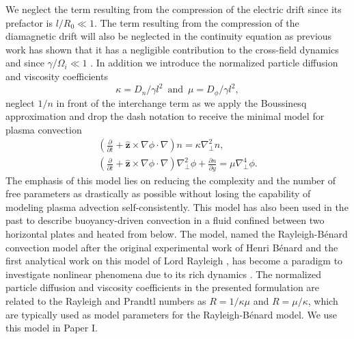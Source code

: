 We neglect the term resulting from the compression of the electric drift since its prefactor is $l/R_0 \ll 1$. The term resulting from the compression of the diamagnetic drift will also be neglected in the continuity equation as previous work has shown that it has a negligible contribution to the cross-field dynamics and since $\gamma/\Omega_i \ll 1$ \cite{Garcia_thesis}. In addition we introduce the normalized particle diffusion and viscosity coefficients
\begin{equation}
	\kappa = D_n/\gamma l^2 \,\,\,\text{and}\,\,\, \mu = D_\phi/\gamma l^2,
\end{equation}
neglect $1/n$ in front of the interchange term as we apply the Boussinesq approximation and drop the dash notation to receive the minimal model for plasma convection 
\begin{subequations}
	\begin{gather}
		\left(\frac{\partial}{\partial t} + \widehat{\textbf{z}}\times \nabla\phi\cdot\nabla\right) n = \kappa\nabla_\perp^2 n,
		\\
		\left(\frac{\partial}{\partial t} + \widehat{\textbf{z}}\times \nabla\phi\cdot\nabla\right)\nabla_\perp^2\phi + \frac{\partial n}{\partial y} = \mu\nabla_\perp^4 \phi.
	\end{gather}
\end{subequations}
The emphasis of this model lies on reducing the complexity and the number of free parameters as drastically as possible without losing the capability of modeling plasma advection self-consistently. This model has also been used in the past to describe buoyancy-driven convection in a fluid confined between two horizontal plates and heated from below. The model, named the Rayleigh-Bénard convection model after the original experimental work of Henri Bénard \cite{benard1901tourbillons} and the first analytical work on this model of Lord Rayleigh \cite{rayleigh1916lix}, has become a paradigm to investigate nonlinear phenomena due to its rich dynamics \cite{decristoforo2020intermittent, busse1978non,siggia1994high,bodenschatz2000recent,kadanoff2001turbulent,ahlers2009heat}. The normalized particle diffusion and viscosity coefficients in the presented formulation are related to the Rayleigh and Prandtl numbers as $R = 1/\kappa\mu$ and $R=\mu/\kappa$, which are typically used as model parameters for the Rayleigh-Bénard model. We use this model in Paper I.


